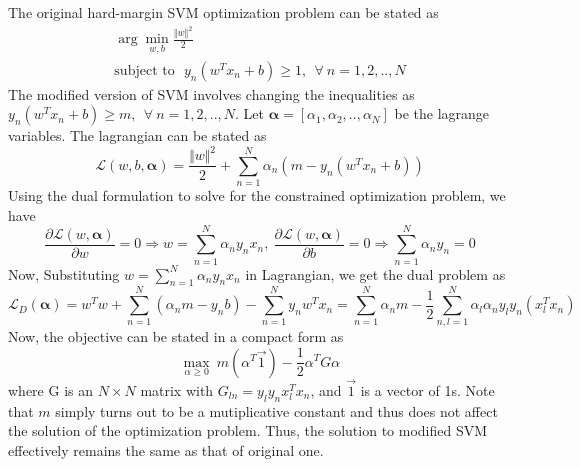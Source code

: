 \documentclass[a4paper,11pt]{article}
\begin{document}
\begin{mlsolution}

The original hard-margin SVM optimization problem can be stated as
\begin{gather*}
\arg \min_{w,b} \frac{\Vert w \Vert^{2}}{2} \\
\text{subject to} \ \ \  y_n(w^{T}x_n + b)\geq 1, \ \ \forall \ n = 1,2,..,N
\end{gather*}
The modified version of SVM involves changing the inequalities as  $y_n(w^{T}x_n + b)\geq m, \ \ \forall \ n = 1,2,..,N$. Let $\mathbf{\alpha} = [\alpha_1, \alpha_2,..,\alpha_N]$ be the lagrange variables. The lagrangian can be stated as
\[
\mathcal{L}(w,b, \mathbf{\alpha}) = \frac{\Vert w \Vert^{2}}{2} + \sum^{N}_{n=1}\alpha_n(m - y_n(w^{T}x_n + b))
\]
Using the dual formulation to solve for the constrained optimization problem, we have
\[
 \frac{\partial \mathcal{L}(w, \mathbf{\alpha})}{\partial w} = 0 \Rightarrow \boxed{w = \sum^{N}_{n=1}\alpha_n y_nx_n}, \ \frac{\partial \mathcal{L}(w, \mathbf{\alpha})}{\partial b} = 0 \Rightarrow \boxed{\sum^{N}_{n=1}\alpha_n y_n = 0}
\] 
Now, Substituting $w = \sum^{N}_{n=1}\alpha_n y_nx_n$ in Lagrangian, we get the dual problem as 
\[
\mathcal{L}_D(\mathbf{\alpha}) = w^{T}w + \sum^{N}_{n=1}(\alpha_n m - y_n b) - \sum^{N}_{n=1}y_n w^{T}x_n = \sum^{N}_{n=1}\alpha_n m - \frac{1}{2} \sum_{n,l =1}^{N}\alpha_l \alpha_n y_l y_n (x^{T}_l x_{n})
\]
Now, the objective can be stated in a compact form as
\[
\max_{\alpha \geq 0} \  m(\alpha^{T}\vec{1}) - \frac{1}{2}\alpha^{T}G \alpha  
\]
where G is an $N\times N$ matrix with $G_{ln} = y_l y_n x^{T}_l x_n$, and $\vec{1}$ is a vector of 1s. Note that $m$ simply turns out to be a mutiplicative constant and thus does not affect the solution of the optimization problem. Thus, the solution to modified SVM effectively remains the same as that of original one.

\end{mlsolution}
\end{document}
